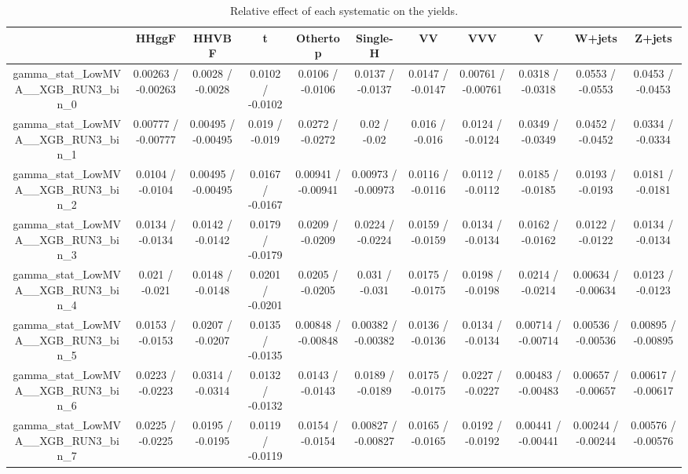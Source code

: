 \documentclass[10pt]{article}
\begin{document}
\begin{table}[htbp]
\begin{center}
\begin{tabular}{|c|c|c|c|c|c|c|c|c|c|c|}
\hline 
      & HHggF      & HHVBF      & t      & Othertop      & Single-H      & VV      & VVV      & V      & W+jets      & Z+jets \\ 
\hline 
  gamma_stat_LowMVA__XGB_RUN3_bin_0 & 0.00263 / -0.00263 & 0.0028 / -0.0028 & 0.0102 / -0.0102 & 0.0106 / -0.0106 & 0.0137 / -0.0137 & 0.0147 / -0.0147 & 0.00761 / -0.00761 & 0.0318 / -0.0318 & 0.0553 / -0.0553 & 0.0453 / -0.0453 \\ 
  gamma_stat_LowMVA__XGB_RUN3_bin_1 & 0.00777 / -0.00777 & 0.00495 / -0.00495 & 0.019 / -0.019 & 0.0272 / -0.0272 & 0.02 / -0.02 & 0.016 / -0.016 & 0.0124 / -0.0124 & 0.0349 / -0.0349 & 0.0452 / -0.0452 & 0.0334 / -0.0334 \\ 
  gamma_stat_LowMVA__XGB_RUN3_bin_2 & 0.0104 / -0.0104 & 0.00495 / -0.00495 & 0.0167 / -0.0167 & 0.00941 / -0.00941 & 0.00973 / -0.00973 & 0.0116 / -0.0116 & 0.0112 / -0.0112 & 0.0185 / -0.0185 & 0.0193 / -0.0193 & 0.0181 / -0.0181 \\ 
  gamma_stat_LowMVA__XGB_RUN3_bin_3 & 0.0134 / -0.0134 & 0.0142 / -0.0142 & 0.0179 / -0.0179 & 0.0209 / -0.0209 & 0.0224 / -0.0224 & 0.0159 / -0.0159 & 0.0134 / -0.0134 & 0.0162 / -0.0162 & 0.0122 / -0.0122 & 0.0134 / -0.0134 \\ 
  gamma_stat_LowMVA__XGB_RUN3_bin_4 & 0.021 / -0.021 & 0.0148 / -0.0148 & 0.0201 / -0.0201 & 0.0205 / -0.0205 & 0.031 / -0.031 & 0.0175 / -0.0175 & 0.0198 / -0.0198 & 0.0214 / -0.0214 & 0.00634 / -0.00634 & 0.0123 / -0.0123 \\ 
  gamma_stat_LowMVA__XGB_RUN3_bin_5 & 0.0153 / -0.0153 & 0.0207 / -0.0207 & 0.0135 / -0.0135 & 0.00848 / -0.00848 & 0.00382 / -0.00382 & 0.0136 / -0.0136 & 0.0134 / -0.0134 & 0.00714 / -0.00714 & 0.00536 / -0.00536 & 0.00895 / -0.00895 \\ 
  gamma_stat_LowMVA__XGB_RUN3_bin_6 & 0.0223 / -0.0223 & 0.0314 / -0.0314 & 0.0132 / -0.0132 & 0.0143 / -0.0143 & 0.0189 / -0.0189 & 0.0175 / -0.0175 & 0.0227 / -0.0227 & 0.00483 / -0.00483 & 0.00657 / -0.00657 & 0.00617 / -0.00617 \\ 
  gamma_stat_LowMVA__XGB_RUN3_bin_7 & 0.0225 / -0.0225 & 0.0195 / -0.0195 & 0.0119 / -0.0119 & 0.0154 / -0.0154 & 0.00827 / -0.00827 & 0.0165 / -0.0165 & 0.0192 / -0.0192 & 0.00441 / -0.00441 & 0.00244 / -0.00244 & 0.00576 / -0.00576 \\ 
\hline 
\end{tabular} 
\caption{Relative effect of each systematic on the yields.} 
\end{center} 
\end{table} 
\end{document}
